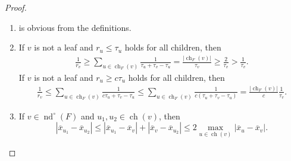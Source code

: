 \documentclass[10pt,a4paper]{amsart}
\DeclareMathOperator{\ch}{ch}
\newcommand{\interp}{\overline{x}} %
\DeclareMathOperator{\nd}{nd}
\begin{document}
\begin{proof}
    \begin{enumerate}
        \item is obvious from the definitions.
        \item If $v$ is not a leaf and $r_u \le \tau_u$ holds for all children, then
            \begin{align*}
                \frac{1}{r_v} \ge \sum_{u\in \ch_F(v)} \frac{1}{\tau_u + \tau_v - \tau_u} = \frac{|\ch_F(v)|}{\tau_v} \ge \frac{2}{\tau_v} > \frac{1}{\tau_v}.
            \end{align*}
            If $v$ is not a leaf and $r_u \ge c \tau_u$ holds for all children, then
            \begin{align*}
                \frac{1}{r_v} \le \sum_{u\in \ch_F(v)} \frac{1}{c \tau_u + \tau_v - \tau_u} \le \sum_{u\in \ch_F(v)} \frac{1}{c(\tau_u + \tau_v - \tau_u)} = \frac{|\ch_F(v)|}{c} \frac{1}{\tau_v}.
            \end{align*}
        \item If $v\in \nd^\circ (F)$ and $u_1,u_2\in \ch(v)$, then \[
                |\interp_{u_1}-\interp_{u_2}| \le |\interp_{u_1} - \interp_v| + |\interp_v - \interp_{u_2}| \le 2 \max_{u\in \ch(v)}|\interp_u-\interp_v|.
        \]
    \end{enumerate}
\end{proof}
\end{document}
